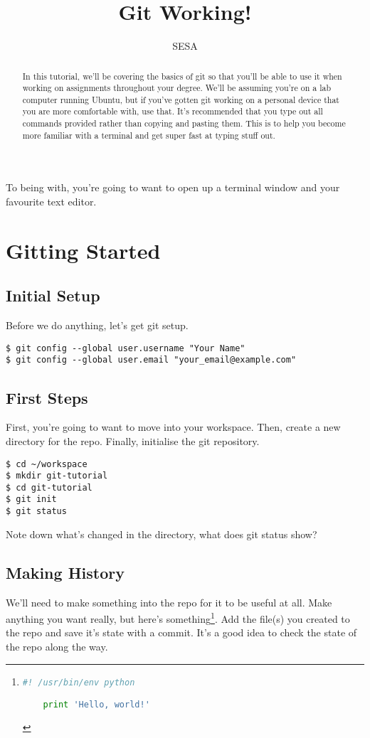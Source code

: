 \documentclass{tufte-handout}
\title{Git Working!}
\author{SESA}
\begin{document}
\maketitle

\begin{abstract}
\noindent In this tutorial, we'll be covering the basics of git so that you'll
be able to use it when working on assignments throughout your degree. We'll be
assuming you're on a lab computer running Ubuntu, but if you've gotten git 
working on a personal device that you are more comfortable with, use that. It's
recommended that you type out all commands provided rather than copying and
pasting them. This is to help you become more familiar with a terminal and
get super fast at typing stuff out.
\end{abstract}

\noindent To being with, you're going to want to open up a terminal window and your
favourite text editor.

\section{Gitting Started}
\subsection{Initial Setup}

Before we do anything, let's get git setup.

\begin{lstlisting}
$ git config --global user.username "Your Name"
$ git config --global user.email "your_email@example.com"
\end{lstlisting}

\subsection{First Steps}

First, you're going to want to move into your workspace. Then, create a new 
directory for the repo. Finally, initialise the git repository.

\begin{lstlisting}
$ cd ~/workspace
$ mkdir git-tutorial
$ cd git-tutorial
$ git init
$ git status
\end{lstlisting}

\noindent Note down what's changed in the directory, what does git status show?

\subsection{Making History}
We'll need to make something into the repo for it to be useful at all. Make
anything you want really, but here's something\cprotect\footnote{
	\begin{lstlisting}[language=Python]
	#! /usr/bin/env python

	print 'Hello, world!'
	\end{lstlisting}
}. Add the file(s) you created to the repo and save it's state with a commit. 
It's a good idea to check the state of the repo along the way.
\end{document}
